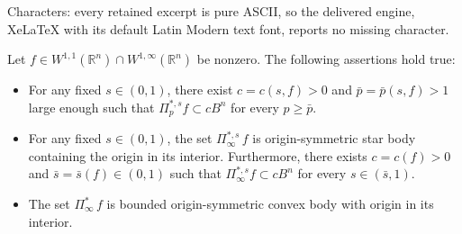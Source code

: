\documentclass[10pt,a4paper]{amsart}
\newcommand{\R}{\mathbb{R}}
\begin{document}
Characters: every retained excerpt is pure ASCII, so the delivered engine, XeLaTeX with its default Latin Modern text font, reports no missing character.
\begin{proposition}\label{prop.exist.infi.polar}
    Let $f \in W^{1, 1}(\R^n) \cap W^{1, \infty}(\R^n)$ be nonzero.
    The following assertions hold true:
    \begin{itemize}
        \item[(i)] 
        For any fixed $s \in (0, 1)$, there exist $c = c(s, f) > 0$ and $\bar p = \bar p(s, f) > 1$ large enough such that $\Pi^{\ast, s}_p f \subset c B^n$ for every $p \geq \bar p$. 
        
        \item[(ii)] 
        For any fixed $s \in (0, 1)$, the set $\Pi^{\ast, s}_\infty \, f$ is origin-symmetric star body containing the origin in its interior.
        Furthermore, there exists $c = c(f) > 0$ and $\bar s = \bar s(f) \in (0, 1)$ such that $\Pi^{\ast, s}_\infty f \subset c B^n$ for every $s \in (\bar s, 1)$.

        \item[(iii)]
        The set $\Pi^{\ast}_\infty \, f$ is bounded origin-symmetric convex body with origin in its interior.
    \end{itemize}
\end{proposition}
\end{document}
